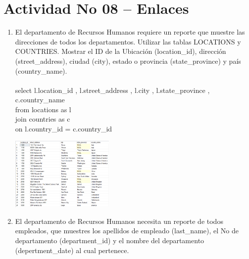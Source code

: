 \section{Actividad No 08 – Enlaces} 
		
\begin{enumerate}[1.]
	\item El departamento de Recursos Humanos requiere un reporte que muestre las direcciones de todos los departamentos. Utilizar las tablas LOCATIONS y COUNTRIES. Mostrar el ID de la Ubicación (location\_id), dirección (street\_address), ciudad (city), estado o provincia (state\_province) y país (country\_name). %
\\
\\select l.location\_id , l.street\_address , l.city , l.state\_province , c.country\_name \\
from locations as l \\
join countries as c \\
on l.country\_id = c.country\_id \\

	\begin{center}
	\includegraphics[width=5cm]{./Imagenes/actividad_08_01} 
	\end{center}


	\item El departamento de Recursos Humanos necesita un reporte de todos empleados, que muestres los apellidos de empleado (last\_name), el No de departamento (department\_id) y el nombre del departamento (depertment\_date) al cual pertenece. 


\end{enumerate}
